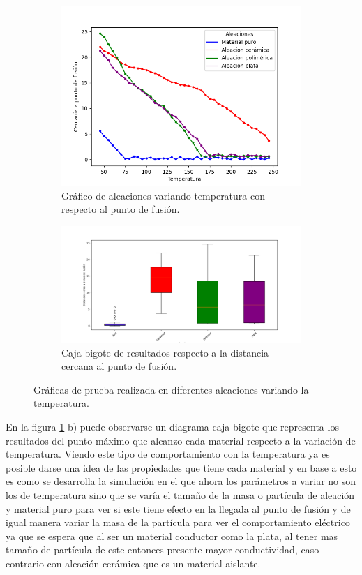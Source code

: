 \documentclass[3pt,twocolumn]{elsarticle}
\begin{document}
\begin{figure}[H]
\centering
\begin{subfigure}[b]{1\linewidth}
\includegraphics[width=\columnwidth]{temp_vari.png}
\caption{Gráfico de aleaciones variando temperatura con respecto al punto de fusión.}
\end{subfigure}
\begin{subfigure}[b]{1\linewidth}
\includegraphics[width=\columnwidth]{cb_temp_vari.png}
\caption{Caja-bigote de resultados respecto a la distancia cercana al punto de fusión.}
\end{subfigure}
\caption{Gráficas de prueba realizada en diferentes aleaciones variando la temperatura.}
\label{fig3}
\end{figure}

En la figura \ref{fig3} b) puede observarse un diagrama caja-bigote que representa los resultados del punto máximo que alcanzo cada material respecto a la variación de temperatura.
Viendo este tipo de comportamiento con la temperatura ya es posible darse una idea de las propiedades que tiene cada material y en base a esto es como se desarrolla la simulación en el que ahora los parámetros a variar no son los de temperatura sino que se varía el tamaño de la masa o partícula de aleación y material puro para ver si este tiene efecto en la llegada al punto de fusión y de igual manera variar la masa de la partícula para ver el comportamiento eléctrico ya que se espera que al ser un material conductor como la plata, al tener mas tamaño de partícula de este entonces presente mayor conductividad, caso contrario con aleación cerámica que es un material aislante. 
\end{document}
